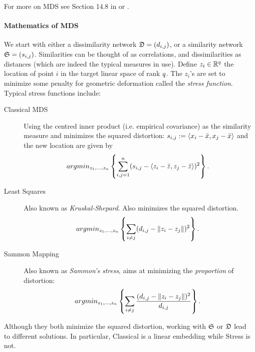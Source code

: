 For more on MDS see Section 14.8 in \cite{hastie_elements_2003} or \cite{borg_modern_2005}.


\paragraph{Mathematics of MDS}
We start with either a dissimilarity network $\mathfrak{D}=(d_{i,j})$, or a similarity network $\mathfrak{S}=(s_{i,j})$.
Similarities can be thought of as correlations, and dissimilarities as distances (which are indeed the typical measures in use).
Define $z_i \in \mathbb{R}^q$ the location of point $i$ in the target linear space of rank $q$. 
The $z_i$'s are set to minimize some penalty for geometric deformation called the \emph{stress function}.
Typical stress functions include:
\begin{description}

\item[Classical MDS] Using the centred inner product (i.e. empirical covariance) as the similarity measure and minimizes the squared distortion:
$s_{i,j}:= \left< x_i-\bar x,x_j-\bar{x} \right>$ and the new location are given by
\begin{align}
\label{eq:mds_classical}
	 argmin_{z_1,\dots,z_n}\left\{ \sum_{i,j=1}^{n} (s_{i,j}-\left< z_i-\bar z,z_j-\bar{z} \right> )^2 \right\}.
\end{align}

\item[Least Squares] Also known as \emph{Kruskal-Shepard}. Also minimizes the squared distortion. 
\begin{align}
\label{eq:mds_stress}
	 argmin_{z_1,\dots,z_n}\left\{ \sum_{i \neq j} (d_{i,j}-\Vert z_i-z_j \Vert )^2 \right\}.
\end{align}

\item[Sammon Mapping] Also known as \emph{Sammon's stress}, aims at minimizing the \emph{proportion} of distortion:
\begin{align}
\label{eq:mds_sammon}
	 argmin_{z_1,\dots,z_n}\left\{ \sum_{i \neq j} \frac{(d_{i,j}-\Vert z_i-z_j \Vert )^2}{d_{i,j}} \right\}.
\end{align}

\end{description}


\begin{remark}
Although they both minimize the squared distortion, working with $\mathfrak{S}$ or $\mathfrak{D}$ lead to different solutions. 
In particular, Classical is a linear embedding while Stress is not. 
\end{remark}



